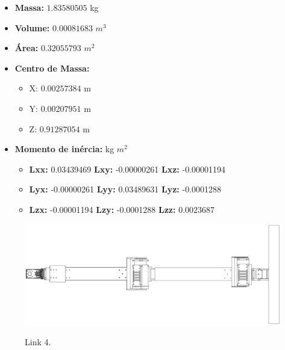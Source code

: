 \documentclass[
12pt,					%
openright,				%
twoside,				%
a4paper,				%
english,
brazil
]{ABNT/abntex2_report}
\begin{document}
	\begin{itemize}
		\item \textbf{Massa:} $1.83580505$ kg		
		\item \textbf{Volume:} $0.00081683$ $m^{3}$
		\item \textbf{Área:} $0.32055793$ $m^{2}$
		\item \textbf{Centro de  Massa:}
		\begin{itemize}
			\item X: $0.00257384$ m
			\item Y: $0.00207951$ m
			\item Z: $0.91287054$ m			
		\end{itemize}
		
		\item \textbf{Momento de inércia:} kg $m^{2}$
		\begin{itemize}
			\item \textbf{Lxx:} 0.03439469 \textbf{Lxy:} -0.00000261 \textbf{Lxz:} -0.00001194			  
			\item \textbf{Lyx:} -0.00000261 \textbf{Lyy:} 0.03489631  \textbf{Lyz:} -0.0001288			  
			\item \textbf{Lzx:} -0.00001194 \textbf{Lzy:} -0.0001288 \textbf{Lzz:} 0.0023687			 
		\end{itemize}
	\end{itemize}

	\begin{figure}[H]
		\centering
		\caption{Link 4.}
		\includegraphics[scale=1.2]{appendix/link4.jpg}
		\label{fig:link4}
	\end{figure}
\end{document}
